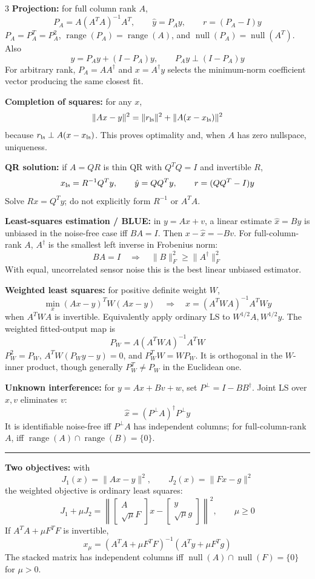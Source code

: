 \documentclass[10pt]{article}
\newcommand{\sect}[1]{\vspace{0.9pt}{\fontsize{7.2}{7.5}\selectfont\textbf{#1}}\vspace{0.25pt}\hrule\vspace{0.8pt}}
\newcommand{\sub}[1]{\textbf{#1}}
\newcommand{\range}{\operatorname{range}}
\newcommand{\nullsp}{\operatorname{null}}
\begin{document}
\begin{multicols*}{3}
\sub{Projection:} for full column rank \(A\),
\[
P_A=A(A^TA)^{-1}A^T,\qquad \hat y=P_Ay,\qquad r=(P_A-I)y
\]
\(P_A=P_A^T=P_A^2\), \(\range(P_A)=\range(A)\), and
\(\nullsp(P_A)=\nullsp(A^T)\). Also
\[
y=P_Ay+(I-P_A)y,\qquad P_Ay\perp(I-P_A)y
\]
For arbitrary rank, \(P_A=AA^\dagger\) and \(x=A^\dagger y\) selects the
minimum-norm coefficient vector producing the same closest fit.

\sub{Completion of squares:} for any \(x\),
\[
\|Ax-y\|^2=\|r_{\rm ls}\|^2+\|A(x-x_{\rm ls})\|^2
\]
because \(r_{\rm ls}\perp A(x-x_{\rm ls})\). This proves optimality and,
when \(A\) has zero nullspace, uniqueness.

\sub{QR solution:} if \(A=QR\) is thin QR with \(Q^TQ=I\) and invertible
\(R\),
\[
x_{\rm ls}=R^{-1}Q^Ty,\qquad \hat y=QQ^Ty,\qquad r=(QQ^T-I)y
\]
Solve \(Rx=Q^Ty\); do not explicitly form \(R^{-1}\) or \(A^TA\).

\sub{Least-squares estimation / BLUE:} in \(y=Ax+v\), a linear estimate
\(\hat x=By\) is unbiased in the noise-free case iff \(BA=I\). Then
\(x-\hat x=-Bv\). For full-column-rank \(A\), \(A^\dagger\) is the
smallest left inverse in Frobenius norm:
\[
BA=I\quad\Longrightarrow\quad \|B\|_F^2\ge\|A^\dagger\|_F^2
\]
With equal, uncorrelated sensor noise this is the best linear unbiased
estimator.

\sub{Weighted least squares:} for positive definite weight \(W\),
\[
\min_x(Ax-y)^TW(Ax-y)
\quad\Rightarrow\quad
x=(A^TWA)^{-1}A^TWy
\]
when \(A^TWA\) is invertible. Equivalently apply ordinary LS to
\(W^{1/2}A,W^{1/2}y\).
The weighted fitted-output map is
\[
P_W=A(A^TWA)^{-1}A^TW
\]
\(P_W^2=P_W\), \(A^TW(P_Wy-y)=0\), and \(P_W^TW=WP_W\). It is
orthogonal in the \(W\)-inner product, though generally
\(P_W^T\ne P_W\) in the Euclidean one.

\sub{Unknown interference:} for \(y=Ax+Bv+w\), set
\(P^\perp=I-BB^\dagger\). Joint LS over \(x,v\) eliminates \(v\):
\[
\hat x=(P^\perp A)^\dagger P^\perp y
\]
It is identifiable noise-free iff \(P^\perp A\) has independent columns;
for full-column-rank \(A\), iff \(\range(A)\cap\range(B)=\{0\}\).

\sect{Multiobjective LS (Lecture 11)}
\sub{Two objectives:} with
\[
J_1(x)=\|Ax-y\|^2,\qquad J_2(x)=\|Fx-g\|^2
\]
the weighted objective is ordinary least squares:
\[
J_1+\mu J_2=
\left\|
\begin{bmatrix}A\\\sqrt\mu F\end{bmatrix}x-
\begin{bmatrix}y\\\sqrt\mu g\end{bmatrix}
\right\|^2,\qquad \mu\ge0
\]
If \(A^TA+\mu F^TF\) is invertible,
\[
x_\mu=(A^TA+\mu F^TF)^{-1}(A^Ty+\mu F^Tg)
\]
The stacked matrix has independent columns iff
\(\nullsp(A)\cap\nullsp(F)=\{0\}\) for \(\mu>0\).


\end{multicols*}
\end{document}
